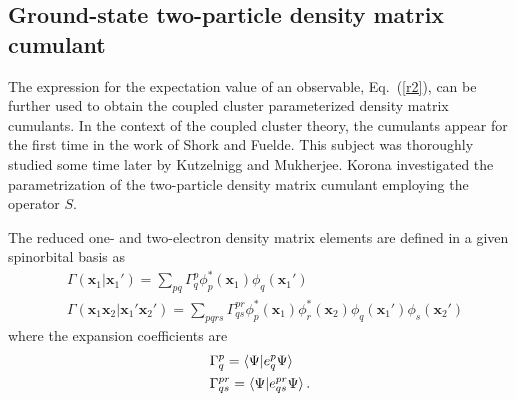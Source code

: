 \documentclass[preprint,12pt]{elsarticle}
\newcommand{\bx}{\mathbf{x}}
\newcommand{\equa}[1]{\begin{align} #1 \end{align}}
\newcommand{\fr}[1]{Eq.~(\ref{#1})}
\begin{document}
\subsection{Ground-state two-particle density matrix cumulant}
The expression for the expectation value of an observable, \fr{r2}, can be further used to obtain the coupled cluster
parameterized density matrix cumulants.   
In the context of the coupled cluster theory, the cumulants appear for the first time in the work of Shork and Fuelde.\cite{schork1992derivation}
This subject was thoroughly studied some time later by Kutzelnigg and Mukherjee.
\cite{kutzelnigg1997normal, kutzelnigg1999cumulant}
Korona\cite{korona2008two} investigated the parametrization of the two-particle density
matrix cumulant employing the operator $S$.

The reduced one- and two-electron density matrix elements are defined in a given spinorbital basis as
\equa{&\Gamma(\bx_1| \bx_1') = \sum_{pq}\Gamma^p_q\phi_p^*(\bx_1)\phi_q(\bx_1')\\
  &\Gamma(\bx_1\bx_2| \bx_1'\bx_2') = \sum_{pqrs}\Gamma^{pr}_{qs}\phi_p^*(\bx_1)\phi_r^*(\bx_2)\phi_q(\bx_1')\phi_s(\bx_2')
}
where the expansion coefficients are
\equa{&\Gamma^p_q = \braket{\Psi|e^p_q \Psi}\\
  &\Gamma^{pr}_{qs} = \braket{\Psi|e^{pr}_{qs} \Psi}.
  }
\end{document}
